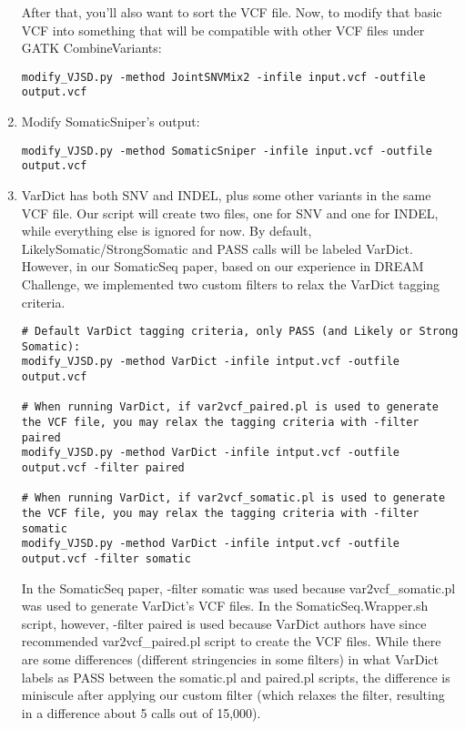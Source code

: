 \documentclass[10pt,letterpaper]{article}
\begin{document}
\begin{sloppypar}
\begin{enumerate}
After that, you'll also want to sort the VCF file. Now, to modify that basic VCF into something that will be compatible with other VCF files under GATK CombineVariants:
	
\begin{lstlisting}
modify_VJSD.py -method JointSNVMix2 -infile input.vcf -outfile output.vcf
\end{lstlisting}

\item	
Modify SomaticSniper's output:
	
\begin{lstlisting}
modify_VJSD.py -method SomaticSniper -infile input.vcf -outfile output.vcf
\end{lstlisting}
	
	
\item	
VarDict has both SNV and INDEL, plus some other variants in the same VCF file. Our script will create two files, one for SNV and one for INDEL, while everything else is ignored for now. By default, LikelySomatic/StrongSomatic and PASS calls will be labeled VarDict. However, in our SomaticSeq paper, based on our experience in DREAM Challenge, we implemented two custom filters to relax the VarDict tagging criteria. 
	
\begin{lstlisting}
# Default VarDict tagging criteria, only PASS (and Likely or Strong Somatic):
modify_VJSD.py -method VarDict -infile intput.vcf -outfile output.vcf
	
# When running VarDict, if var2vcf_paired.pl is used to generate the VCF file, you may relax the tagging criteria with -filter paired
modify_VJSD.py -method VarDict -infile intput.vcf -outfile output.vcf -filter paired
	
# When running VarDict, if var2vcf_somatic.pl is used to generate the VCF file, you may relax the tagging criteria with -filter somatic
modify_VJSD.py -method VarDict -infile intput.vcf -outfile output.vcf -filter somatic
\end{lstlisting}
	

In the SomaticSeq paper, -filter somatic was used because var2vcf\_somatic.pl was used to generate VarDict's VCF files. In the SomaticSeq.Wrapper.sh script, however, -filter paired is used because VarDict authors have since recommended var2vcf\_paired.pl script to create the VCF files. While there are some differences (different stringencies in some filters) in what VarDict labels as PASS between the somatic.pl and paired.pl scripts, the difference is miniscule after applying our custom filter (which relaxes the filter, resulting in a difference about 5 calls out of 15,000). 


\end{enumerate}
\end{sloppypar}
\end{document}
